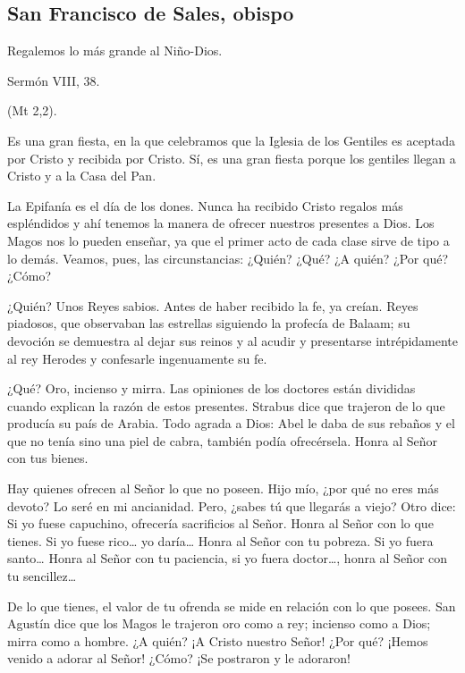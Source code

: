 \begin{body}
\begin{body}
\subsection{San Francisco de Sales, obispo}

Regalemos lo más grande al Niño-Dios.

Sermón VIII, 38.

 (Mt 2,2).

Es una gran fiesta, en la que celebramos que la Iglesia de los Gentiles es aceptada por Cristo y recibida por Cristo. Sí, es una gran fiesta porque los gentiles llegan a Cristo y a la Casa del Pan.

La Epifanía es el día de los dones. Nunca ha recibido Cristo regalos más espléndidos y ahí tenemos la manera de ofrecer nuestros presentes a Dios. Los Magos nos lo pueden enseñar, ya que el primer acto de cada clase sirve de tipo a lo demás. Veamos, pues, las circunstancias: ¿Quién? ¿Qué? ¿A quién? ¿Por qué? ¿Cómo?

¿Quién? Unos Reyes sabios. Antes de haber recibido la fe, ya creían. Reyes piadosos, que observaban las estrellas siguiendo la profecía de Balaam; su devoción se demuestra al dejar sus reinos y al acudir y presentarse intrépidamente al rey Herodes y confesarle ingenuamente su fe.

¿Qué? Oro, incienso y mirra. Las opiniones de los doctores están divididas cuando explican la razón de estos presentes. Strabus dice que trajeron de lo que producía su país de Arabia. Todo agrada a Dios: Abel le daba de sus rebaños y el que no tenía sino una piel de cabra, también podía ofrecérsela. Honra al Señor con tus bienes.

Hay quienes ofrecen al Señor lo que no poseen. Hijo mío, ¿por qué no eres más devoto? Lo seré en mi ancianidad. Pero, ¿sabes tú que llegarás a viejo? Otro dice: Si yo fuese capuchino, ofrecería sacrificios al Señor. Honra al Señor con lo que tienes. Si yo fuese rico\ldots{} yo daría\ldots{} Honra al Señor con tu pobreza. Si yo fuera santo\ldots{} Honra al Señor con tu paciencia, si yo fuera doctor\ldots{}, honra al Señor con tu sencillez\ldots{}

De lo que tienes, el valor de tu ofrenda se mide en relación con lo que posees. San Agustín dice que los Magos le trajeron oro como a rey; incienso como a Dios; mirra como a hombre. ¿A quién? ¡A Cristo nuestro Señor! ¿Por qué? ¡Hemos venido a adorar al Señor! ¿Cómo? ¡Se postraron y le adoraron!


\end{body}
\end{body}
